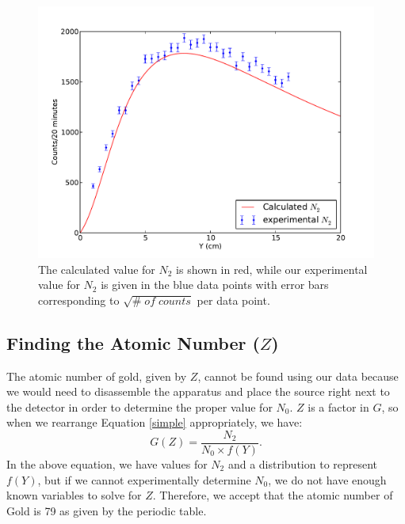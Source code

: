 \begin{figure}[H]
\begin{center}
\includegraphics[width=5in]{N2.pdf}
\caption{The calculated value for $N_2$ is shown in red, while our experimental value for $N_2$ is given in the blue data points with error bars corresponding to $\sqrt{\#\; of\; counts}$ per data point.}
\end{center}
\end{figure}

\subsection{Finding the Atomic Number ($Z$)}
The atomic number of gold, given by $Z$, cannot be found using our data because we would need to disassemble the apparatus and place the source right next to the detector in order to determine the proper value for $N_0$. $Z$ is a factor in $G$, so when we rearrange Equation \ref{simple} appropriately, we have: 
\begin{equation}G(Z)= \frac{N_2}{N_0 \times f(Y)}. \end {equation} 
In the above equation, we have values for $N_2$ and a distribution to represent $f(Y)$, but if we cannot experimentally determine $N_0$,  we do not have enough known variables to solve for $Z$. Therefore, we accept that the atomic number of Gold is 79 as given by the periodic table. 

